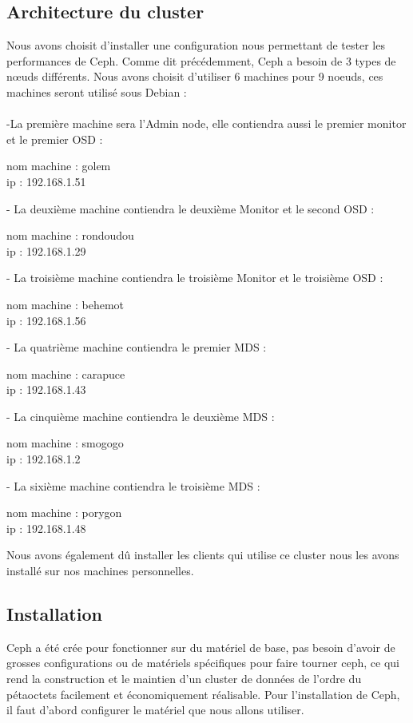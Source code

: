 \documentclass{article}
\begin{document}
	\subsection{Architecture du cluster}
	Nous avons choisit d'installer une configuration nous permettant de tester les performances de Ceph. Comme dit précédemment, Ceph a besoin de 3 types de nœuds différents. Nous avons choisit d'utiliser 6 machines pour 9 noeuds, ces machines seront utilisé sous Debian :
\\\\-La première machine sera l'Admin node, elle contiendra aussi le premier monitor et le premier OSD :

nom machine : golem
\\ip : 192.168.1.51

- La deuxième machine contiendra le deuxième Monitor et le second OSD :

nom machine : rondoudou 
\\ip :  192.168.1.29

- La troisième machine contiendra le troisième Monitor et le troisième OSD :

nom machine : behemot
\\ip :    192.168.1.56

- La quatrième machine contiendra le premier MDS :

nom machine : carapuce 
\\ip : 192.168.1.43

- La cinquième machine contiendra le deuxième MDS :

nom machine : smogogo
\\ip : 192.168.1.2

- La sixième machine contiendra le troisième MDS :

nom machine : porygon
\\ip : 192.168.1.48

Nous avons également dû installer les clients qui utilise ce cluster nous les avons installé sur nos machines personnelles.

	\subsection{Installation}
	
	Ceph a été crée pour fonctionner sur du matériel de base, pas besoin d'avoir de grosses configurations ou de matériels spécifiques pour faire tourner ceph, ce qui rend la construction et le maintien d'un cluster de données de l'ordre du pétaoctets facilement et économiquement réalisable.
	Pour l'installation de Ceph, il faut d'abord configurer le matériel que nous allons utiliser.
\end{document}
